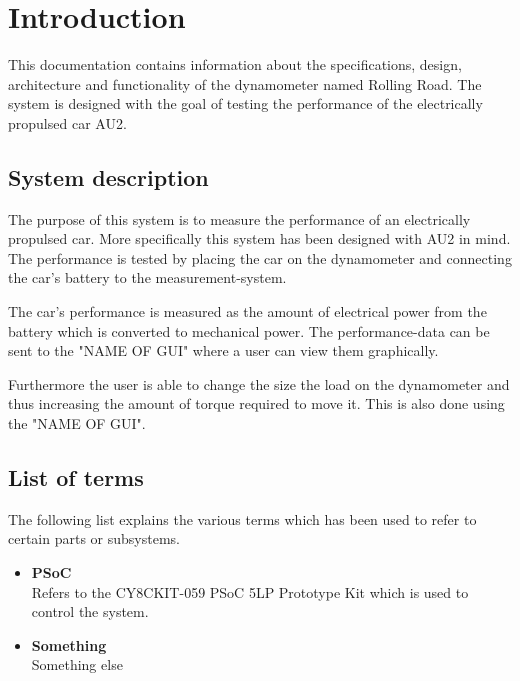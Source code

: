 \chapter{Introduction}
This documentation contains information about the specifications, design, architecture and functionality of the dynamometer named Rolling Road. The system is designed with the goal of testing the performance of the electrically propulsed car AU2.

\section{System description}
The purpose of this system is to measure the performance of an electrically propulsed car. More specifically this system has been designed with AU2 in mind. The performance is tested by placing the car on the dynamometer and connecting the car's battery to the measurement-system.

The car's performance is measured as the amount of electrical power from the battery which is converted to mechanical power. The performance-data can be sent to the "NAME OF GUI" where a user can view them graphically.

Furthermore the user is able to change the size the load on the dynamometer and thus increasing the amount of torque required to move it. This is also done using the "NAME OF GUI".

\section{List of terms}
The following list explains the various terms which has been used to refer to certain parts or subsystems.
\begin{itemize}
	\item \textbf{PSoC}\\
	Refers to the CY8CKIT-059 PSoC 5LP Prototype Kit which is used to control the system.
	\item \textbf{Something}\\
	Something else
\end{itemize}
